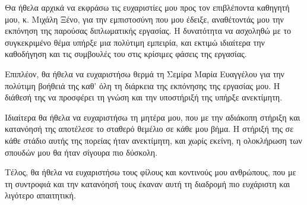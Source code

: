 \begin{acknowledgements}
    Θα ήθελα αρχικά να εκφράσω τις ευχαριστίες μου προς τον επιβλέποντα καθηγητή μου, κ. Μιχάλη Ξένο, για την εμπιστοσύνη που μου έδειξε, αναθέτοντάς μου την εκπόνηση της παρούσας διπλωματικής εργασίας. Η δυνατότητα να ασχοληθώ με το συγκεκριμένο θέμα υπήρξε μια πολύτιμη εμπειρία, και εκτιμώ ιδιαίτερα την καθοδήγηση και τις συμβουλές του στις κρίσιμες φάσεις της εργασίας.

    Επιπλέον, θα ήθελα να ευχαριστήσω θερμά τη Σεμίρα Μαρία Ευαγγέλου για την πολύτιμη βοήθειά της καθ’ όλη τη διάρκεια της εκπόνησης της εργασίας μου. Η διάθεσή της να προσφέρει τη γνώση και την υποστήριξή της υπήρξε ανεκτίμητη.

    Ιδιαίτερα θα ήθελα να ευχαριστήσω τη μητέρα μου, που με την αδιάκοπη στήριξη και κατανόησή της αποτέλεσε το σταθερό θεμέλιο σε κάθε μου βήμα. Η στήριξή της σε κάθε στάδιο αυτής της πορείας ήταν ανεκτίμητη, και χωρίς εκείνη, η ολοκλήρωση των σπουδών μου θα ήταν σίγουρα πιο δύσκολη.

    Τέλος, θα ήθελα να ευχαριστήσω τους φίλους και κοντινούς μου ανθρώπους, που με τη συντροφιά και την κατανόησή τους έκαναν αυτή τη διαδρομή πιο ευχάριστη και λιγότερο απαιτητική.
\end{acknowledgements}

